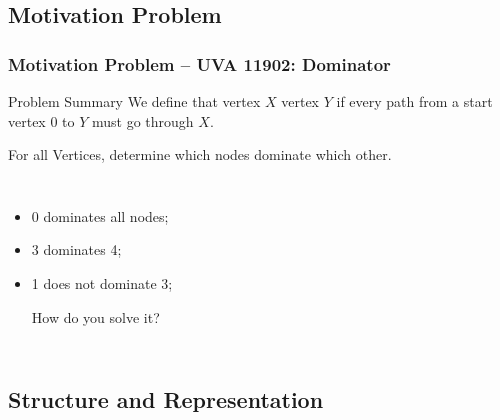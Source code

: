 \documentclass{beamer}
\begin{document}
\subsection{Motivation Problem}
\begin{frame}
  \frametitle{Motivation Problem -- UVA 11902: Dominator}
  {\smaller
    \begin{block}{Problem Summary}
      We define that vertex $X$  vertex $Y$ if
      every path from a start vertex $0$ to $Y$ must go through $X$.

      \bigskip

      For all Vertices, determine which nodes dominate which other.
  \end{block}}

  \vspace{1cm}

  \begin{center}
    \begin{columns}[T]
      \begin{itemize}
      \item 0 dominates all nodes;
      \item 3 dominates 4;
      \item 1 does not dominate 3;

        \bigskip

        How do you solve it?

      \end{itemize}
    \end{columns}
  \end{center}
\end{frame}

\subsection{Structure and Representation}
\end{document}
